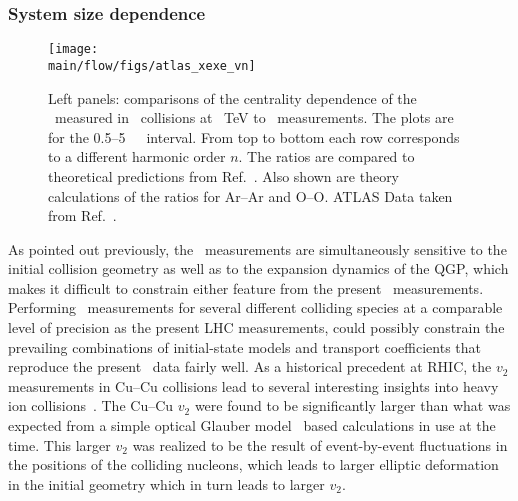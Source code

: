 \subsubsection{System size dependence}
\label{sec:flow_sizedep}

\begin{figure}[!ht]
\begin{center}
\texttt{[image: \\main/flow/figs/atlas\_xexe\_vn]}
\caption{
Left panels: comparisons of the centrality dependence of the \vn\ measured 
  in \pbpb\ collisions at ~TeV to \xexe\ measurements. 
The plots are for the 0.5--5~\UGeVc\ \pT\ interval. 
From top to bottom each row corresponds to a different harmonic order $n$.
The ratios are compared to theoretical predictions from Ref.~\cite{Giacalone:2017dud}.
Also shown are theory calculations of the ratios for Ar--Ar and O--O.
ATLAS Data taken from Ref.~\cite{ATLAS-CONF-2018-011}.
}
\label{fig:atlas_xexe_vn}
\end{center}
\end{figure}

As pointed out previously, the \vn\ measurements are simultaneously
  sensitive to the initial collision geometry as well as to the 
  expansion dynamics of the QGP, which makes it difficult to 
  constrain either feature from the present \vn\ measurements.
Performing \vn\ measurements for several different colliding species
  at a comparable level of precision as the present LHC measurements,  
  could possibly constrain the prevailing combinations of initial-state 
  models and transport coefficients that reproduce the present \vn\ data 
  fairly well.
As a historical precedent at RHIC, the $v_2$ measurements in Cu--Cu 
  collisions lead to several interesting insights into heavy ion 
  collisions~\cite{Adare:2006ti}.
The Cu--Cu $v_2$ were found to be significantly larger than what was 
  expected from a simple optical Glauber model~\cite{Miller:2007ri}
  based calculations in use at the time.
This larger $v_2$ was realized to be the result of event-by-event fluctuations
  in the positions of the colliding nucleons, which leads to larger
  elliptic deformation in the initial geometry which in turn leads 
  to larger $v_2$.


